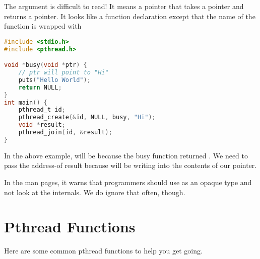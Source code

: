 The argument  is difficult to read!
It means a pointer that takes a  pointer and returns a  pointer.
It looks like a function declaration except that the name of the function is wrapped with 

\begin{lstlisting}[language=C]
#include <stdio.h>
#include <pthread.h>

void *busy(void *ptr) {
    // ptr will point to "Hi"
    puts("Hello World");
    return NULL;
}
int main() {
    pthread_t id;
    pthread_create(&id, NULL, busy, "Hi");
    void *result;
    pthread_join(id, &result);
}
\end{lstlisting}

In the above example,  will be  because the busy function returned .
We need to pass the address-of result because  will be writing into the contents of our pointer.

In the man pages, it warns that programmers should use  as an opaque type and not look at the internals.
We do ignore that often, though.

\section{Pthread Functions}

Here are some common pthread functions to help you get going.

